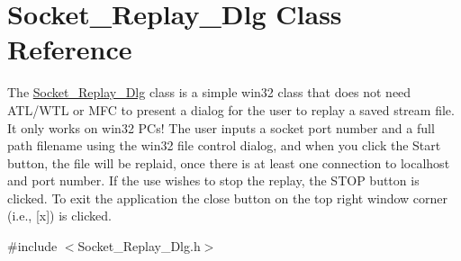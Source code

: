\hypertarget{class_socket___replay___dlg}{}\section{Socket\+\_\+\+Replay\+\_\+\+Dlg Class Reference}
\label{class_socket___replay___dlg}


The \hyperlink{class_socket___replay___dlg}{Socket\+\_\+\+Replay\+\_\+\+Dlg} class is a simple win32 class that does not need A\+T\+L/\+W\+T\+L or M\+F\+C to present a dialog for the user to replay a saved stream file. It only works on win32 P\+Cs! The user inputs a socket port number and a full path filename using the win32 file control dialog, and when you click the Start button, the file will be replaid, once there is at least one connection to localhost and port number. If the use wishes to stop the replay, the S\+T\+O\+P button is clicked. To exit the application the close button on the top right window corner (i.\+e., \mbox{[}x\mbox{]}) is clicked.  




{\ttfamily \#include $<$Socket\+\_\+\+Replay\+\_\+\+Dlg.\+h$>$}

